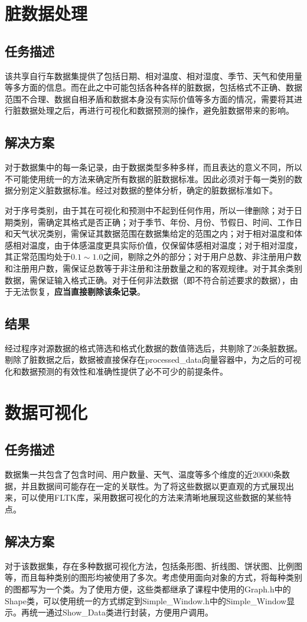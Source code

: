 \documentclass[CJK]{ctexart}
\begin{document}
\section{脏数据处理}
\subsection{任务描述}
该共享自行车数据集提供了包括日期、相对温度、相对湿度、季节、天气和使用量等多方面的信息。而在此之中可能包括各种各样的脏数据，包括格式不正确、数据范围不合理、数据自相矛盾和数据本身没有实际价值等多方面的情况，需要将其进行脏数据处理之后，再进行可视化和数据预测的操作，避免脏数据带来的影响。
\subsection{解决方案}
对于数据集中的每一条记录，由于数据类型多种多样，而且表达的意义不同，所以不可能使用统一的方法来确定所有数据的脏数据标准。因此必须对于每一类别的数据分别定义脏数据标准。经过对数据的整体分析，确定的脏数据标准如下。\par
对于序号类别，由于其在可视化和预测中不起到任何作用，所以一律删除；对于日期类别，需确定其格式是否正确；对于季节、年份、月份、节假日、时间、工作日和天气状况类别，需保证其数据范围在数据集给定的范围之内；对于相对温度和体感相对温度，由于体感温度更具实际价值，仅保留体感相对温度；对于相对湿度，其正常范围均处于$0.1\sim1.0$之间，剔除之外的部分；对于用户总数、非注册用户数和注册用户数，需保证总数等于非注册和注册数量之和的客观规律。对于其余类别数据，需保证输入格式正确。对于任何非法数据（即不符合前述要求的数据），由于无法恢复，\textbf{应当直接剔除该条记录}。
\subsection{结果}
经过程序对源数据的格式筛选和格式化数据的数值筛选后，共剔除了26条脏数据。剔除了脏数据之后，数据被直接保存在processed\_data向量容器中，为之后的可视化和数据预测的有效性和准确性提供了必不可少的前提条件。
\section{数据可视化}
\subsection{任务描述}
    数据集一共包含了包含时间、用户数量、天气、温度等多个维度的近20000条数据，并且数据间可能存在一定的关联性。为了将这些数据以更直观的方式展现出来，可以使用FLTK库，采用数据可视化的方法来清晰地展现这些数据的某些特点。
\subsection{解决方案}
    对于该数据集，存在多种数据可视化方法，包括条形图、折线图、饼状图、比例图等，而且每种类别的图形均被使用了多次。考虑使用面向对象的方式，将每种类别的图都写为一个类。为了使用方便，这些类都继承了课程中使用的Graph.h中的Shape类，可以使用统一的方式绑定到Simple\_Window.h中的Simple\_Window显示。再统一通过Show\_Data类进行封装，方便用户调用。\par
    
\end{document}

